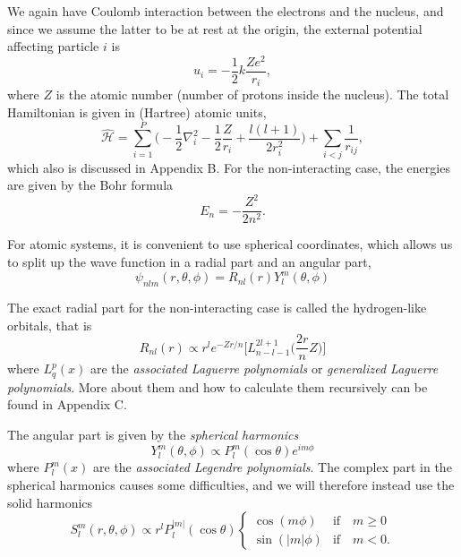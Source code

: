 We again have Coulomb interaction between the electrons and the nucleus, and since we assume the latter to be at rest at the origin, the external potential affecting particle $i$ is
\begin{equation}
u_i=- \frac{1}{2} k\frac{Ze^2}{r_i},
\end{equation}
where $Z$ is the atomic number (number of protons inside the nucleus). The total Hamiltonian is given in (Hartree) atomic units, 
\begin{equation}
\label{eq:AtomicHamiltonian}
\hat{\mathcal{H}} = \sum_{i=1}^{P} \Big(-\frac{1}{2} \nabla_i^2 - \frac{1}{2} \frac{Z}{r_i}+\frac{l(l+1)}{2r_i^2}\Big) + \sum_{i<j} \frac{1}{r_{ij}},
\end{equation}
which also is discussed in Appendix B. For the non-interacting case, the energies are given by the Bohr formula
\begin{equation}
E_n=-\frac{Z^2}{2n^2}.
\label{eq:bohrformula}
\end{equation}

For atomic systems, it is convenient to use spherical coordinates, which allows us to split up the wave function in a radial part and an angular part,
\begin{equation}
\psi_{nlm}(r,\theta,\phi)=R_{nl}(r)Y_l^m(\theta,\phi)
\end{equation}

The exact radial part for the non-interacting case is called the hydrogen-like orbitals, that is
\begin{equation}
R_{nl}(r)\propto r^le^{-Zr/n}\Big[L_{n-l-1}^{2l+1}\Big(\frac{2r}{n}Z\Big)\Big]
\end{equation}
where $L_{q}^p(x)$ are the \textit{associated Laguerre polynomials} or \textit{generalized Laguerre polynomials}. More about them and how to calculate them recursively can be found in Appendix C. 

The angular part is given by the \textit{spherical harmonics}
\begin{equation}
Y_l^m(\theta,\phi)\propto P_l^m(\cos\theta)e^{im\phi}
\end{equation}
where $P_l^m(x)$ are the \textit{associated Legendre polynomials}. The complex part in the spherical harmonics causes some difficulties, and we will therefore instead use the solid harmonics
\begin{equation}
\label{eq:V_ext}
S_l^m(r,\theta,\phi)\propto r^lP_l^{|m|}(\cos\theta)
\begin{cases} 
\cos(m\phi) & \text{if} \quad m\geq0 \\
\sin(|m|\phi) & \text{if} \quad m<0.
\end{cases}
\end{equation}

